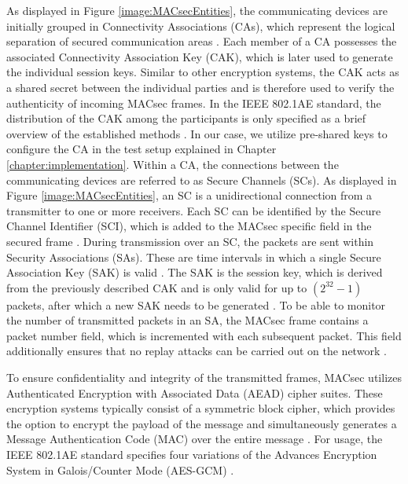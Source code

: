 \documentclass[conference, onecolumn, a4paper]{IEEEtran}
\begin{document}
\noindent As displayed in Figure \ref{image:MACsecEntities}, the communicating devices are initially grouped in Connectivity Associations (CAs), which 
represent the logical separation of secured communication areas \cite[p. 35]{IEEE-802-1AE:2018}. Each member of a CA possesses the associated Connectivity 
Association Key (CAK), which is later used to generate the individual session keys. Similar to other encryption systems, the CAK acts as a shared 
secret between the individual parties and is therefore used to verify the authenticity of incoming MACsec frames. In the IEEE 802.1AE standard, the 
distribution of the CAK among the participants is only specified as a brief overview of the established methods \cite[p. 230]{IEEE-802-1AE:2018}. 
In our case, we utilize pre-shared keys to configure the CA in the test setup explained in Chapter \ref{chapter:implementation}. Within a CA, the 
connections between the communicating devices are referred to as Secure Channels (SCs). As displayed in Figure \ref{image:MACsecEntities}, 
an SC is a unidirectional connection from a transmitter to one or more receivers. Each SC can be identified by the Secure Channel Identifier (SCI), 
which is added to the MACsec specific field in the secured frame \cite[p. 43]{IEEE-802-1AE:2018}. During transmission over an SC, the packets are sent 
within Security Associations (SAs). These are time intervals in which a single Secure Association Key (SAK) is valid \cite[p. 44]{IEEE-802-1AE:2018}. 
The SAK is the session key, which is derived from the previously described CAK and is only valid for up to ${(2^{32} -1)}$ packets, after which a new 
SAK needs to be generated \cite[p. 66]{IEEE-802-1AE:2018}. To be able to monitor the number of transmitted packets in an SA, the MACsec frame contains 
a packet number field, which is incremented with each subsequent packet. This field additionally ensures that no replay attacks can be carried out on 
the network \cite[p. 145]{IEEE-802-1AE:2018}. 

\smallskip
To ensure confidentiality and integrity of the transmitted frames, MACsec utilizes Authenticated Encryption with Associated Data (AEAD) cipher suites. 
These encryption systems typically consist of a symmetric block cipher, which provides the option to encrypt the payload of the message and simultaneously 
generates a Message Authentication Code (MAC) over the entire message \cite{GOOSE_confidentiality_integrity:2020}. For usage, the IEEE 802.1AE standard 
specifies four variations of the Advances Encryption System in Galois/Counter Mode (AES-GCM) \cite[p. 143ff]{IEEE-802-1AE:2018}.
\end{document}
